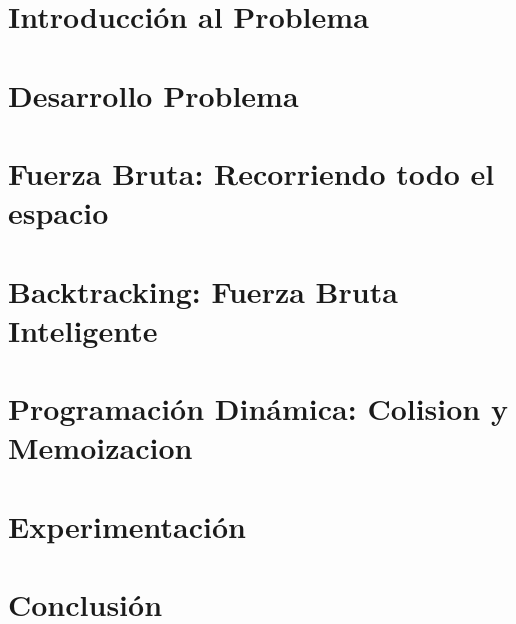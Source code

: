 \documentclass[11pt, a4paper]{article}
\begin{document}

\maketitle
\newpage

\tableofcontents
\newpage

\section{Introducción al Problema}


\section{Desarrollo Problema}


\section{Fuerza Bruta: Recorriendo todo el espacio}


\section{Backtracking: Fuerza Bruta Inteligente}



\section{Programación Dinámica: Colision y Memoizacion}



\section{Experimentación}


\section{Conclusión}

\end{document}
